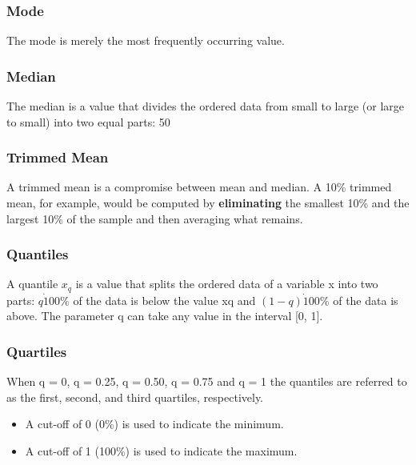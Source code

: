 \subsubsection{Mode \cite{ism-1}}\label{mode}
The mode is merely the most frequently occurring value.

\subsubsection{Median \cite{ism-1}}\label{median}
The median is a value that divides the ordered data from small to large (or large to small) into two equal parts: 50%

\subsubsection{Trimmed Mean \cite{ism-1}}\label{Trimmed Mean}
A trimmed mean is a compromise between mean and median. A 10\% trimmed mean, for example, would be computed by \textbf{eliminating} the smallest 10\% and the largest 10\% of the sample and then averaging what remains.

\subsubsection{Quantiles \cite{ism-1}}\label{Quantiles}
A quantile $x_q$ is a value that splits the ordered data of a variable x into two parts: $q \dot 100\%$ of the data is below the value xq and $(1 - q) \dot 100\%$ of the data is above. The parameter q can take any value in the interval [0, 1].

\subsubsection{Quartiles \cite{ism-1}}\label{Quartiles}
When q = 0, q = 0.25, q = 0.50, q = 0.75 and q = 1 the quantiles are referred to as the first, second, and third quartiles, respectively.
\begin{itemize}
    \item A cut-off of 0 (0\%) is used to indicate the minimum.
    \item A cut-off of 1 (100\%) is used to indicate the maximum.
\end{itemize}

